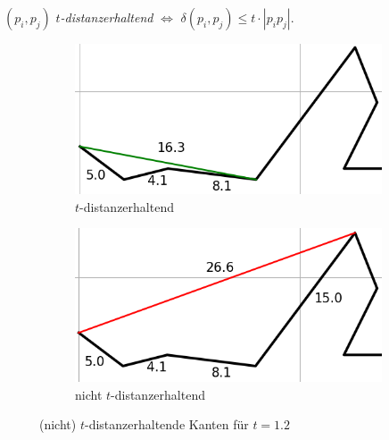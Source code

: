 \documentclass{beamer}
\begin{document}
	\begin{frame}
		\centering
		$(p_i, p_j)$ \emph{$t$-distanzerhaltend} $\Leftrightarrow$ $\delta(p_i, p_j) \leq t \cdot |p_ip_j|$.
		\vspace{0.5cm}
		\begin{figure}
			\centering
			\begin{subfigure}{.5\textwidth}
				\centering
				\includegraphics[width=0.95\linewidth]{t_distance_preserving_edge_len.png}
				\caption{$t$-distanzerhaltend}

			\end{subfigure}%
			\begin{subfigure}{.5\textwidth}
				\centering
				\includegraphics[width=0.95\linewidth]{not_t_distance_preserving_edge_len.png}
				\caption{nicht $t$-distanzerhaltend}
			\end{subfigure}
			\caption{ (nicht) $t$-distanzerhaltende Kanten für $t = 1.2$}
		\end{figure}
	\end{frame}
	
\end{document}

